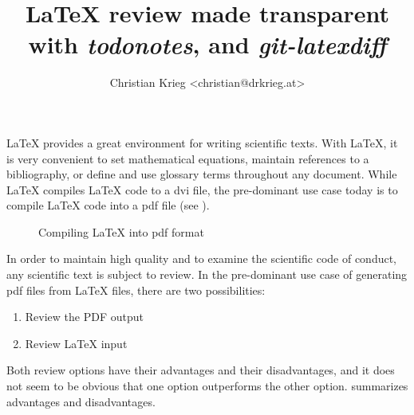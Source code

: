 \documentclass[%
	a4paper,%
	twoside%
] {article}
\title{\LaTeX{} review made transparent with \emph{todonotes}, and \emph{git-latexdiff}}
\author{Christian Krieg <christian@drkrieg.at>}
\begin{document}
\maketitle

\LaTeX{} provides a great environment for writing scientific texts. With \LaTeX{},
it is very convenient to set mathematical equations, maintain references to a
bibliography, or define and use glossary terms throughout any document. While
\LaTeX{} compiles \LaTeX{} code to a \gls{dvi} file, the pre-dominant use case today
is to compile \LaTeX{} code into a  \gls{pdf} file (see ).

\begin{figure}[htp]
    \centering
    \caption{Compiling \LaTeX{} into \protect\gls{pdf} format}
    \label{fig:compile-pdf}
\end{figure}

In order to maintain high quality and to examine the scientific code of conduct,
any scientific text is subject to review. In the pre-dominant use case of
generating \gls{pdf} files from \LaTeX{} files, there are two possibilities:

\begin{enumerate}
    \item{Review the PDF output}
    \item{Review \LaTeX{} input}
\end{enumerate}


Both review options have their advantages and their disadvantages, and it does
not seem to be obvious that one option outperforms the other option.
 summarizes advantages and disadvantages.
\end{document}
